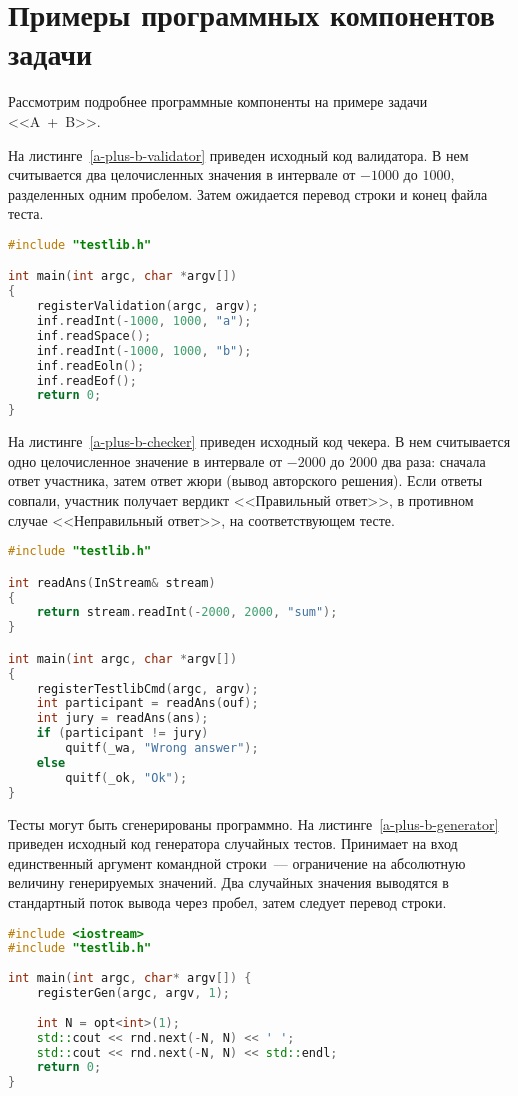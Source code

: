 \documentclass[times,specification,annotation]{style/itmo-student-thesis/itmo-student-thesis}
\begin{document}
\section{Примеры программных компонентов задачи}

Рассмотрим подробнее программные компоненты на примере задачи <<A~+~B>>.

На листинге~\ref{a-plus-b-validator} приведен исходный код валидатора. В нем считывается два целочисленных значения в интервале от $-1000$ до $1000$, разделенных одним пробелом. Затем ожидается перевод строки и конец файла теста.

\begin{lstlisting}[float=!h,caption={Пример валидатора},label={a-plus-b-validator},language=c++]
#include "testlib.h"

int main(int argc, char *argv[])
{
    registerValidation(argc, argv);
    inf.readInt(-1000, 1000, "a");
    inf.readSpace();
    inf.readInt(-1000, 1000, "b");
    inf.readEoln();
    inf.readEof();
    return 0;
}
\end{lstlisting}

На листинге~\ref{a-plus-b-checker} приведен исходный код чекера. В нем считывается одно целочисленное значение в интервале от $-2000$ до $2000$ два раза: сначала ответ участника, затем ответ жюри (вывод авторского решения). Если ответы совпали, участник получает вердикт <<Правильный ответ>>, в противном случае <<Неправильный ответ>>, на соответствующем тесте.

\begin{lstlisting}[float=!h,caption={Пример чекера},label={a-plus-b-checker},language=c++]
#include "testlib.h"

int readAns(InStream& stream)
{
    return stream.readInt(-2000, 2000, "sum");
}

int main(int argc, char *argv[])
{
    registerTestlibCmd(argc, argv);
    int participant = readAns(ouf);
    int jury = readAns(ans);
    if (participant != jury)
        quitf(_wa, "Wrong answer");
    else
        quitf(_ok, "Ok");
}
\end{lstlisting}

Тесты могут быть сгенерированы программно. На листинге~\ref{a-plus-b-generator} приведен исходный код генератора случайных тестов. Принимает на вход единственный аргумент командной строки~--- ограничение на абсолютную величину генерируемых значений. Два случайных значения выводятся в стандартный поток вывода через пробел, затем следует перевод строки.

\begin{lstlisting}[float=!h,caption={Пример генератора},label={a-plus-b-generator},language=c++]
#include <iostream>
#include "testlib.h"
 
int main(int argc, char* argv[]) {
    registerGen(argc, argv, 1);
 
    int N = opt<int>(1);
    std::cout << rnd.next(-N, N) << ' ';
    std::cout << rnd.next(-N, N) << std::endl;
    return 0;
}
\end{lstlisting}
\end{document}
